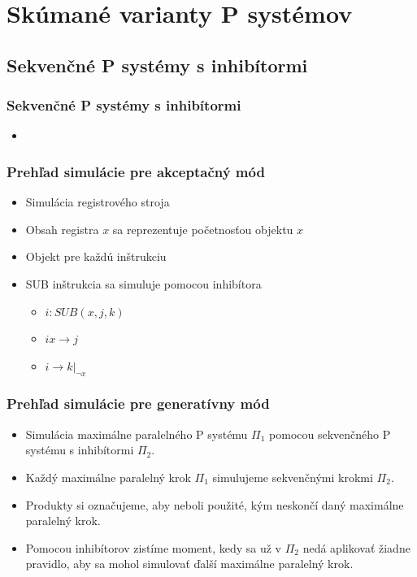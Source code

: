 

\section{Skúmané varianty P systémov} %
\label{sec:sk_man_varianty_p_syst_mov}

\subsection{Sekvenčné P systémy s inhibítormi} %
\label{sub:sekven_n_p_syst_my_s_inhib_tormi}

\begin{frame}[t]\frametitle{Sekvenčné P systémy s inhibítormi}
  \begin{itemize}
    \item {}
  \end{itemize}
\end{frame}


\begin{frame}[t]\frametitle{Prehľad simulácie pre akceptačný mód}
  \begin{itemize}
    \item Simulácia registrového stroja
    \pause
    \item Obsah registra $x$ sa reprezentuje početnosťou objektu $x$
    \item Objekt pre každú inštrukciu
    \pause
    \item SUB inštrukcia sa simuluje pomocou inhibítora
    \begin{itemize}
      \item $i: SUB(x,j,k)$
      \item $ix\rightarrow j$
      \item $i\rightarrow k|_{\neg{x}}$
    \end{itemize}
  \end{itemize}
\end{frame}
\note{}

\begin{frame}[t]\frametitle{Prehľad simulácie pre generatívny mód}
  \begin{itemize}
    \item Simulácia maximálne paralelného P systému $\Pi_1$ pomocou sekvenčného P systému s inhibítormi $\Pi_2$.
    \pause
    \item Každý maximálne paralelný krok $\Pi_1$ simulujeme sekvenčnými krokmi $\Pi_2$.
    \pause
    \item Produkty si označujeme, aby neboli použité, kým neskončí daný maximálne paralelný krok.
    \pause
    \item Pomocou inhibítorov zistíme moment, kedy sa už v $\Pi_2$ nedá aplikovať žiadne pravidlo, aby sa mohol simulovať ďalší maximálne paralelný krok.
  \end{itemize}
\end{frame}
\note{}

